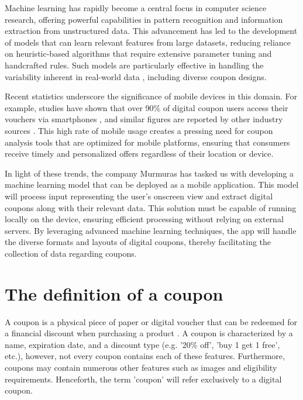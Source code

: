 \documentclass[licencjacka,en]{pracamgr}
\begin{document}
Machine learning has rapidly become a central focus in computer science research, offering powerful capabilities in pattern recognition and information extraction from unstructured data. This advancement has led to the development of models that can learn relevant features from large datasets, reducing reliance on heuristic-based algorithms that require extensive parameter tuning and handcrafted rules. Such models are particularly effective in handling the variability inherent in real-world data \cite{ml_general}, including diverse coupon designs.

Recent statistics underscore the significance of mobile devices in this domain. For example, studies have shown that over 90\% of digital coupon users access their vouchers via smartphones \cite{emarketer_coupon_stats}, and similar figures are reported by other industry sources \cite{coupon_stats_2}. This high rate of mobile usage creates a pressing need for coupon analysis tools that are optimized for mobile platforms, ensuring that consumers receive timely and personalized offers regardless of their location or device.

In light of these trends, the company Murmuras has tasked us with developing a machine learning model that can be deployed as a mobile application. This model will process input representing the user's onscreen view and extract digital coupons along with their relevant data. This solution must be capable of running locally on the device, ensuring efficient processing without relying on external servers. By leveraging advanced machine learning techniques, the app will handle the diverse formats and layouts of digital coupons, thereby facilitating the collection of data regarding coupons.

\section{The definition of a coupon} 
A coupon is a physical piece of paper or digital voucher that can be redeemed for a financial discount when purchasing a product \cite{coupon_definition}. A coupon is characterized by a name, expiration date, and a discount type (e.g. '20\% off', 'buy 1 get 1 free', etc.), however, not every coupon contains each of these features. Furthermore, coupons may contain numerous other features such as images and eligibility requirements. Henceforth, the term 'coupon' will refer exclusively to a digital coupon.
\end{document}
